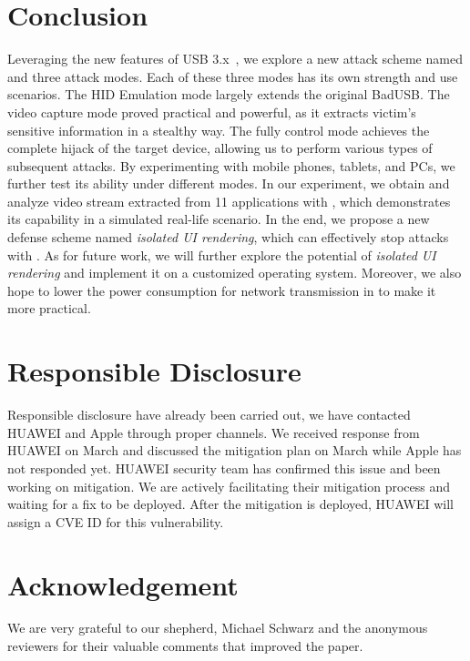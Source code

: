 \section{Conclusion}
\label{sec:conclusion}

Leveraging the new features of \ac{USB} 3.x~\cite{usb30,usb31,usb32}, we explore a
new attack scheme named \tool and three attack modes. Each of these three modes
has its own strength and use scenarios. The \ac{HID} Emulation mode largely extends the
original BadUSB. The video capture mode proved practical and powerful, as it extracts
victim's sensitive information in a stealthy way. The fully control mode
achieves the complete hijack of the target device, allowing us to perform various
types of subsequent attacks. By experimenting \tool with mobile phones, tablets,
and PCs, we further test its ability under different modes. In our experiment, we
obtain and analyze video stream extracted from 11 applications with \tool,
which demonstrates its capability in a simulated real-life scenario. In the end, we
propose a new defense scheme named \textit{isolated UI rendering}, which can
effectively stop attacks with \tool.
As for future work, we will further explore the potential of \textit{isolated UI
rendering} and implement it on a customized operating system. Moreover, we also
hope to lower the power consumption for network transmission in \tool to make
it more practical.

\section{Responsible Disclosure}
Responsible disclosure have already been carried out, we have contacted HUAWEI and Apple through proper channels. We received response from HUAWEI on March  and discussed the mitigation plan on March  while Apple has not responded yet. HUAWEI security team has confirmed this issue and been working on mitigation. We are actively facilitating their mitigation process and waiting for a fix to be deployed. After the mitigation is deployed, HUAWEI will assign a CVE ID for this vulnerability.

\section{Acknowledgement}
We are very grateful to our shepherd, Michael Schwarz and the anonymous reviewers for their valuable comments that improved the paper.